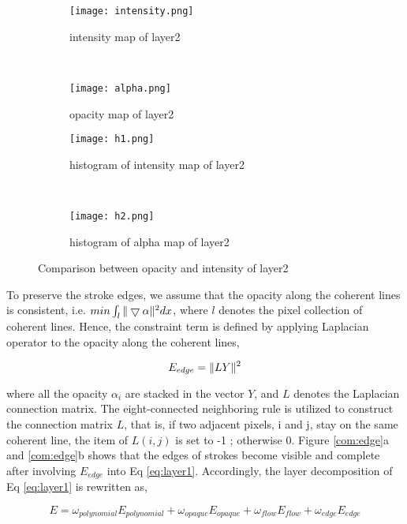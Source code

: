 \begin{figure}[H]
 		\centering
	\begin{subfigure}[b]{0.4\textwidth}
		\centering
		\texttt{[image: intensity.png]}
		\caption{intensity map of layer2}
	\end{subfigure}
	~
	\begin{subfigure}[b]{0.4\textwidth}
		\centering
		\texttt{[image: alpha.png]}
		\caption{opacity map of layer2}
	\end{subfigure}
 

 
	\centering
	\begin{subfigure}[b]{0.4\textwidth}
		\texttt{[image: h1.png]}
		\caption{histogram of intensity map of layer2}
	\end{subfigure}
	~  	
	\begin{subfigure}[b]{0.4\textwidth}
		\texttt{[image: h2.png]}
		\caption{histogram of alpha map of layer2}
	\end{subfigure}
	\caption{Comparison between opacity and intensity of layer2}
	\label{histo}
\end{figure}
 
To preserve the stroke edges, we assume that the opacity along the coherent lines is consistent, i.e. $min \int_{l}\Arrowvert \bigtriangledown\alpha \Arrowvert^2 dx $, where $l$ denotes the pixel collection of coherent lines. Hence, the constraint term is defined by applying Laplacian operator to the opacity along the coherent lines,

\begin{equation} 
E_{edge}=\Arrowvert LY \Arrowvert^2 
\end{equation} 

where all the opacity $\alpha_i$ are stacked in the vector $Y$, and $L$ denotes the Laplacian connection matrix. The eight-connected neighboring rule is utilized to construct the connection matrix $L$, that is, if two adjacent pixels, i and j, stay on the same coherent line, the item of $L(i,j)$ is set to -1 ; otherwise 0. Figure \ref{com:edge}a and \ref{com:edge}b shows that the edges of strokes become visible and complete after involving $E_{edge}$ into Eq \ref{eq:layer1}.
Accordingly, the layer decomposition of Eq \ref{eq:layer1} is rewritten as,

\begin{equation}
E=\omega_{polynomial}E_{polynomial}+\omega_{opaque}E_{opaque}+\omega_{flow}E_{flow}+\omega_{edge}E_{edge}
\label{eq:layer_sum}
\end{equation} 

